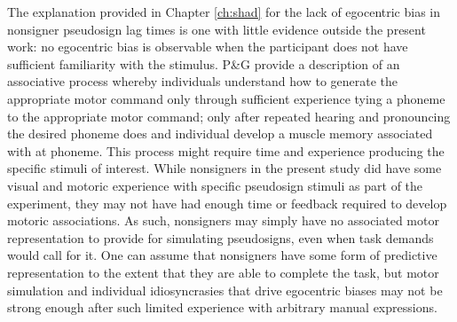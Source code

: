             The explanation provided in Chapter \ref{ch:shad} for the lack of egocentric bias in nonsigner pseudosign lag times is one with little evidence outside the present work: no egocentric bias is observable when the participant does not have sufficient familiarity with the stimulus. P\&G provide a description of an associative process whereby individuals understand how to generate the appropriate motor command only through sufficient experience tying a phoneme to the appropriate motor command; only after repeated hearing and pronouncing the desired phoneme does and individual develop a muscle memory associated with at phoneme. This process might require time and experience producing the specific stimuli of interest. While nonsigners in the present study did have some visual and motoric experience with specific pseudosign stimuli as part of the experiment, they may not have had enough time or feedback required to develop motoric associations. As such, nonsigners may simply have no associated motor representation to provide for simulating pseudosigns, even when task demands would call for it. One can assume that nonsigners have some form of predictive representation to the extent that they are able to complete the task, but motor simulation and individual idiosyncrasies that drive egocentric biases may not be strong enough after such limited experience with arbitrary manual expressions. \par

